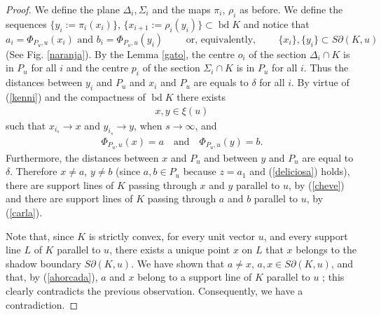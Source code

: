 \documentclass[12pt]{amsart}
\newcommand{\bd}{\operatorname*{bd}}
\begin{document}
\begin{proof}
                  We define the plane $\Delta_i, \Sigma_i$ and the maps $\pi_i$, $\rho_i$ as before. 
                 We define the sequences $\{y_{i}:=\pi_i(x_{i})\}$, 
                 $\{x_{i+1}:=\rho_i(y_{i})\}\subset \bd K$  and notice that 
\[
a_{i}=\Phi_{P_u,u}(x_{i}) \textrm{ and }b_{i}=\Phi_{P_u,u}(y_{i}) \textrm{ }\textrm{ }\textrm{ }\textrm{ or, equivalently, }\textrm{ }\textrm{ }\textrm{ }\{x_{i}\}, \{ y_{i}\}\subset S\partial (K,u)
\]
                   (See Fig. \ref{naranja}).  By the Lemma \ref{gato}, the centre $o_i$ of the section 
                   $\Delta_i \cap K$ is in $P_u$ for all $i$ and the centre $p_i$ of the section 
                   $\Sigma_i \cap K$ is in $P_u$ for all $i$. Thus the distances between $y_{i}$ and 
                   $P_u$ and $x_{i}$ and $P_u$ are equals to $\delta$ for all $i$. By virtue of (\ref{kenni}) 
                   and the compactness of $\bd K$ there exists 
                   \begin{eqnarray}\label{cheve}
                   x,y\in\xi(u)
                   \end{eqnarray}
                    such that 
                   $x_{i_s} \rightarrow x $ and $y_{i_s}\rightarrow y$, when $s\rightarrow \infty$, and 
                   \begin{eqnarray}\label{ahorcada}
                   \Phi_{P_u ,u}(x)=a \textrm{ }\textrm{  and }\textrm{ } \Phi_{P_u,u}(y)=b.
                    \end{eqnarray}
                    Furthermore, the distances between 
                   $x$ and $P_u$ and between $y$ and $P_u$ are equal to $\delta$. Therefore $x\not=a$, 
                   $y\not=b$ (since $a,b\in P_u$ because $z=a_1$ and (\ref{deliciosa}) holds), 
                   there are support lines of $K$ passing through $x$ and $y$ parallel to $u$, by (\ref{cheve}) 
                   and there are support lines of $K$ passing through $a$ and $b$ parallel to $u$, by (\ref{carla}).
                  
                   Note that, since $K$ is strictly convex, for every unit vector $u$, and every support line $L$ 
                      of $K$ parallel to $u$, there exists a unique point $x$ on $L$ that $x$ belongs to the shadow 
                      boundary $S\partial (K,u)$. We have shown that $a\not=x$, $a,x\in S\partial (K,u)$, and that, 
                      by (\ref{ahorcada}), 
                      $a$ and $x$ belong to a support line of $K$ parallel to $u$ ; this clearly contradicts the previous 
                      observation. Consequently, we have a contradiction.
\end{proof}
\end{document}
